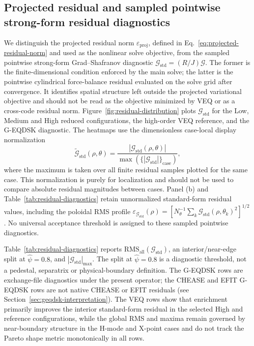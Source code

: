 \documentclass[final, 3p, times]{elsarticle}
\begin{document}
\subsection{Projected residual and sampled pointwise strong-form residual diagnostics}
\label{sec:residual-distribution}

We distinguish the projected residual norm $\varepsilon_{\mathrm{proj}}$, defined in Eq.~\eqref{eq:projected-residual-norm} and used as the nonlinear solve objective, from the sampled pointwise strong-form Grad--Shafranov diagnostic $\mathcal{G}_{\mathrm{std}}=(R/J)\mathcal{G}$. The former is the finite-dimensional condition enforced by the main solve; the latter is the pointwise cylindrical force-balance residual evaluated on the solve grid after convergence. It identifies spatial structure left outside the projected variational objective and should not be read as the objective minimized by VEQ or as a cross-code residual norm. Figure~\ref{fig:residual-distribution} plots $\mathcal{G}_{\mathrm{std}}$ for the Low, Medium and High reduced configurations, the high-order VEQ reference, and the G-EQDSK diagnostic. The heatmaps use the dimensionless case-local display normalization
\begin{equation}
    \tilde{\mathcal{G}}_{\mathrm{std}}(\rho,\theta)
    =
    \frac{|\mathcal{G}_{\mathrm{std}}(\rho,\theta)|}
    {\max\!\left(\{|\mathcal{G}_{\mathrm{std}}|\}_{\mathrm{case}}\right)},
\end{equation}
where the maximum is taken over all finite residual samples plotted for the same case. This normalization is purely for localization and should not be used to compare absolute residual magnitudes between cases. Panel (b) and Table~\ref{tab:residual-diagnostics} retain unnormalized standard-form residual values, including the poloidal RMS profile $\varepsilon_{\mathcal{G}_{\mathrm{std}}}(\rho)=[N_\theta^{-1}\sum_k\mathcal{G}_{\mathrm{std}}(\rho,\theta_k)^2]^{1/2}$. No universal acceptance threshold is assigned to these sampled pointwise diagnostics.

Table~\ref{tab:residual-diagnostics} reports $\mathrm{RMS}_{\mathrm{all}}(\mathcal{G}_{\mathrm{std}})$, an interior/near-edge split at $\hat{\psi}=0.8$, and $|\mathcal{G}_{\mathrm{std}}|_{\max}$. The split at $\hat{\psi}=0.8$ is a diagnostic threshold, not a pedestal, separatrix or physical-boundary definition. The G-EQDSK rows are exchange-file diagnostics under the present operator; the CHEASE and EFIT G-EQDSK rows are not native CHEASE or EFIT residuals (see Section~\ref{sec:geqdsk-interpretation}). The VEQ rows show that enrichment primarily improves the interior standard-form residual in the selected High and reference configurations, while the global RMS and maxima remain governed by near-boundary structure in the H-mode and X-point cases and do not track the Pareto shape metric monotonically in all rows.
\end{document}
